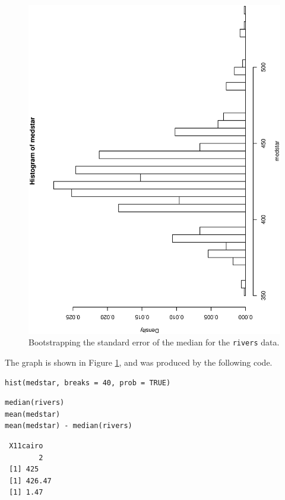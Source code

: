 \documentclass[captions=tableheading]{scrbook}
\begin{document}
\begin{example}
\begin{figure}[th]
  \includegraphics[angle=270, totalheight=4in]{ps/Bootstrapping-se-median.ps}
  \caption[Bootstrapping the standard error of the median for the \texttt{rivers} data]{\small Bootstrapping the standard error of the median for the \texttt{rivers} data.}
  \label{fig:Bootstrapping-se-median}
\end{figure}

The graph is shown in Figure \ref{fig:Bootstrapping-se-median}, and was produced by the following code.


\begin{verbatim}
hist(medstar, breaks = 40, prob = TRUE)
\end{verbatim}


\begin{verbatim}
median(rivers)
mean(medstar)
mean(medstar) - median(rivers)
\end{verbatim}

\begin{verbatim}
 X11cairo 
        2
 [1] 425
 [1] 426.47
 [1] 1.47
\end{verbatim}

\end{example}
\end{document}
